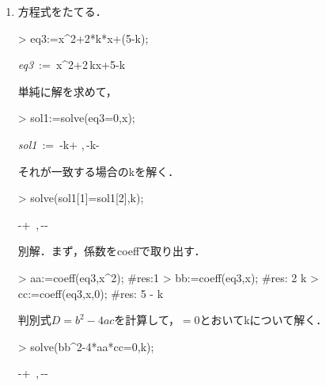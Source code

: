 \begin{enumerate}
\item
方程式をたてる．
\begin{MapleInput}
> eq3:=x^2+2*k*x+(5-k);
\end{MapleInput}
\begin{MapleOutput}
{\it eq3}\, := \,{x}^{2}+2\,kx+5-k
\end{MapleOutput}
単純に解を求めて，
\begin{MapleInput}
> sol1:=solve(eq3=0,x);
\end{MapleInput}
\begin{MapleOutput}
{\it sol1}\, := \,-k+ ,\,-k- 
\end{MapleOutput}
それが一致する場合のkを解く．
\begin{MapleInput}
> solve(sol1[1]=sol1[2],k);
\end{MapleInput}
\begin{MapleOutput}
-+\, ,\,--\, 
\end{MapleOutput}
別解．まず，係数をcoeffで取り出す．
\begin{MapleInput}
> aa:=coeff(eq3,x^2); #res:1
> bb:=coeff(eq3,x);   #res: 2 k
> cc:=coeff(eq3,x,0); #res: 5 - k
\end{MapleInput}
判別式$D=b^2-4ac$を計算して，$=0$とおいてkについて解く．
\begin{MapleInput}
> solve(bb^2-4*aa*cc=0,k);
\end{MapleInput}
\begin{MapleOutput}
-+\, ,\,--\, 
\end{MapleOutput}
\end{enumerate}